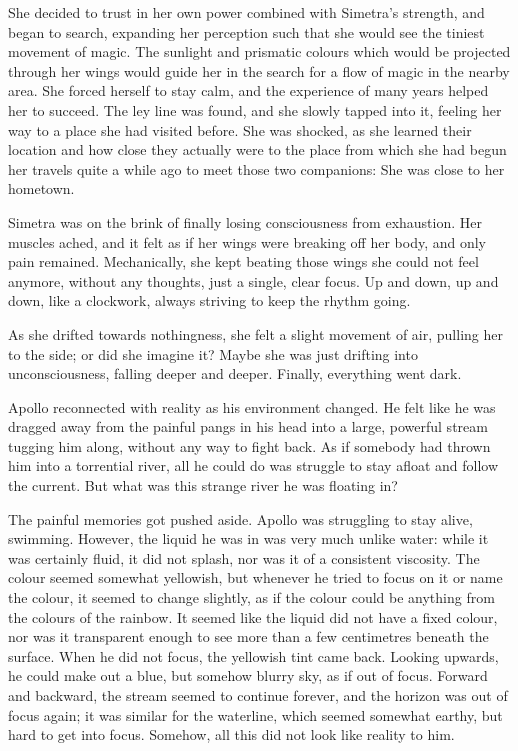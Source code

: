 She decided to trust in her own power combined with Simetra's strength, and began to search, expanding her perception such that she would see the tiniest movement of magic. The sunlight and prismatic colours which would be projected through her wings would guide her in the search for a flow of magic in the nearby area. She forced herself to stay calm, and the experience of many years helped her to succeed. The ley line was found, and she slowly tapped into it, feeling her way to a place she had visited before. She was shocked, as she learned their location and how close they actually were to the place from which she had begun her travels quite a while ago to meet those two companions: She was close to her hometown.

\fancybreaker{}

Simetra was on the brink of finally losing consciousness from exhaustion. Her muscles ached, and it felt as if her wings were breaking off her body, and only pain remained. Mechanically, she kept beating those wings she could not feel anymore, without any thoughts, just a single, clear focus. Up and down, up and down, like a clockwork, always striving to keep the rhythm going. 

As she drifted towards nothingness, she felt a slight movement of air, pulling her to the side; or did she imagine it? Maybe she was just drifting into unconsciousness, falling deeper and deeper. Finally, everything went dark.

\fancybreaker{}

Apollo reconnected with reality as his environment changed. He felt like he was dragged away from the painful pangs in his head into a large, powerful stream tugging him along, without any way to fight back. As if somebody had thrown him into a torrential river, all he could do was struggle to stay afloat and follow the current. But what was this strange river he was floating in?

The painful memories got pushed aside. Apollo was struggling to stay alive, swimming. However, the liquid he was in was very much unlike water: while it was certainly fluid, it did not splash, nor was it of a consistent viscosity. The colour seemed somewhat yellowish, but whenever he tried to focus on it or name the colour, it seemed to change slightly, as if the colour could be anything from the colours of the rainbow. It seemed like the liquid did not have a fixed colour, nor was it transparent enough to see more than a few centimetres beneath the surface. When he did not focus, the yellowish tint came back. Looking upwards, he could make out a blue, but somehow blurry sky, as if out of focus. Forward and backward, the stream seemed to continue forever, and the horizon was out of focus again; it was similar for the waterline, which seemed somewhat earthy, but hard to get into focus. Somehow, all this did not look like reality to him. 

